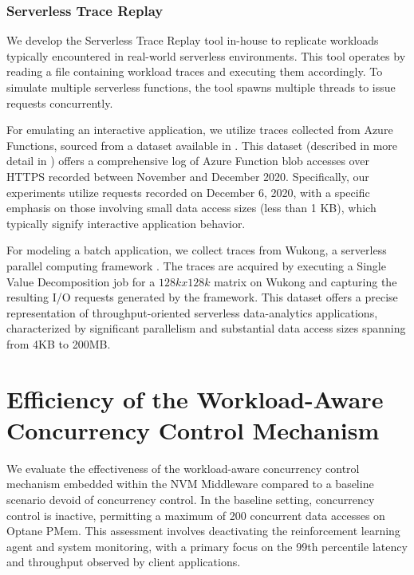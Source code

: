 \subsubsection{Serverless Trace Replay}

We develop the Serverless Trace Replay tool in-house to replicate workloads typically encountered in real-world serverless environments. This tool operates by reading a file containing workload traces and executing them accordingly. To simulate multiple serverless functions, the tool spawns multiple threads to issue requests concurrently.

For emulating an interactive application, we utilize traces collected from Azure Functions, sourced from a dataset available in \cite{GitHubAz35:online}. This dataset (described in more detail in \cite{romero2021faat}) offers a comprehensive log of Azure Function blob accesses over HTTPS recorded between November and December 2020. Specifically, our experiments utilize requests recorded on December 6, 2020, with a specific emphasis on those involving small data access sizes (less than 1 KB), which typically signify interactive application behavior.

For modeling a batch application, we collect traces from Wukong, a serverless parallel computing framework \cite{carver2020wukong}. The traces are acquired by executing a Single Value Decomposition job for a $128kx128k$ matrix on Wukong and capturing the resulting I/O requests generated by the framework. This dataset offers a precise representation of throughput-oriented serverless data-analytics applications, characterized by significant parallelism and substantial data access sizes spanning from 4KB to 200MB.


\section{Efficiency of the Workload-Aware Concurrency Control Mechanism}

We evaluate the effectiveness of the workload-aware concurrency control mechanism embedded within the NVM Middleware compared to a baseline scenario devoid of concurrency control. In the baseline setting, concurrency control is inactive, permitting a maximum of 200 concurrent data accesses on Optane PMem. This assessment involves deactivating the reinforcement learning agent and system monitoring, with a primary focus on the 99th percentile latency and throughput observed by client applications.

